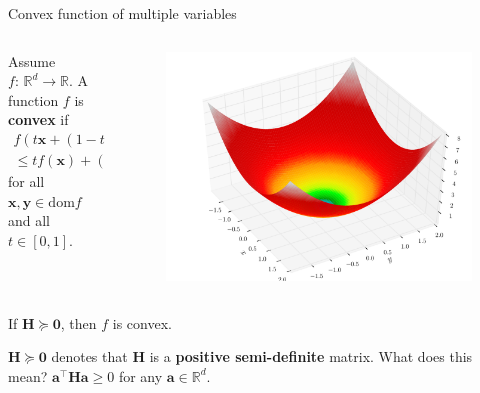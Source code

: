 \documentclass{beamer}
\begin{document}
\begin{frame}{Convex function of multiple variables}
\begin{columns}
\begin{column}{.5\textwidth}
Assume $f:\,\mathbb{R}^d\to\mathbb{R}$. A function $f$ is \textbf{convex} if \pause
\begin{multline*}
f(t\mathbf{x}+(1-t)\mathbf{y})\\\le tf(\mathbf{x})+(1-t)f(\mathbf{y})
\end{multline*}
for all $\mathbf{x}, \mathbf{y}\in\mathrm{dom}f$ and all $t\in[0,1]$.    
\end{column}
\begin{column}{.5\textwidth}
\begin{figure}
    \centering
    \includegraphics[width=\textwidth]{plots/Sphere_function_in_3D.pdf}
\end{figure}
\end{column}
\end{columns}
\vfill

\pause
\begin{theorem}
If $\mathbf{H}\succeq\mathbf{0}$, then $f$ is convex.
\end{theorem}
\vfill

\pause $\mathbf{H}\succeq\mathbf{0}$ denotes that $\mathbf{H}$ is a \textbf{positive semi-definite} matrix. What does this mean? \pause $\mathbf{a}^\top\mathbf{Ha}\ge0$ for any $\mathbf{a}\in\mathbb{R}^d$.

\end{frame}
\end{document}
